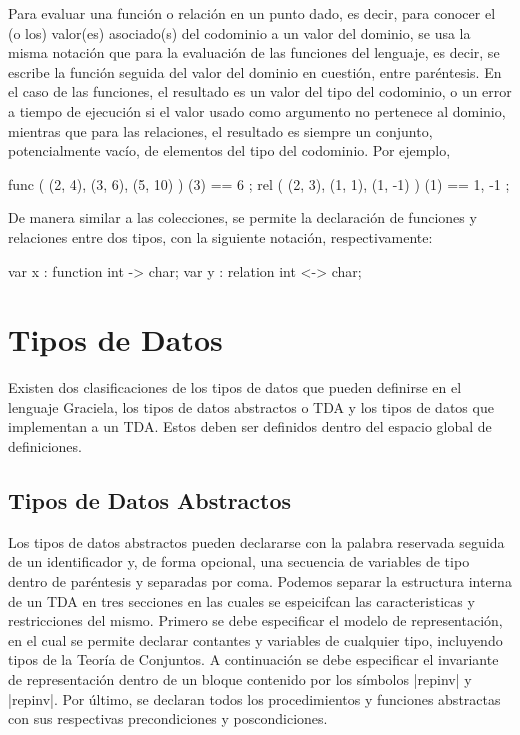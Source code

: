 Para evaluar una función o relación en un punto dado, es decir, para conocer el
(o los) valor(es) asociado(s) del codominio a un valor del dominio, se usa la
misma notación que para la evaluación de las funciones del lenguaje, es decir,
se escribe la función seguida del valor del dominio en cuestión, entre
paréntesis. En el caso de las funciones, el resultado es un valor del tipo del
codominio, o un error a tiempo de ejecución si el valor usado como argumento no
pertenece al dominio, mientras que para las relaciones, el resultado es siempre
un conjunto, potencialmente vacío, de elementos del tipo del codominio. Por
ejemplo,

\begin{gracielacode}
{ func ({ (2, 4), (3, 6), (5, 10) }) (3) == 6 };
{ rel  ({ (2, 3), (1, 1), (1, -1) }) (1) == {1, -1} };
\end{gracielacode}

De manera similar a las colecciones, se permite la declaración de funciones y
relaciones entre dos tipos, con la siguiente notación, respectivamente:

\begin{gracielacode}
var x : function int -> char;
var y : relation int <-> char;
\end{gracielacode}

\section{Tipos de Datos}
Existen dos clasificaciones de los tipos de datos que pueden definirse en el
lenguaje Graciela, los tipos de datos abstractos o TDA y los tipos de datos
que implementan a un TDA. Estos deben ser definidos dentro del espacio global
de definiciones.

\subsection{Tipos de Datos Abstractos}

Los tipos de datos abstractos pueden declararse con la palabra reservada
 seguida de un identificador y, de forma opcional, una secuencia
de variables de tipo dentro de paréntesis y separadas por coma. Podemos separar
la estructura interna de un TDA en tres secciones en las cuales se espeicifcan
las caracteristicas y restricciones del mismo. Primero se debe especificar el
modelo de representación, en el cual se permite declarar contantes y variables
de cualquier tipo, incluyendo tipos de la Teoría de Conjuntos. A continuación se
debe especificar el invariante de representación dentro de un bloque contenido
por los símbolos \ingra|{repinv| y \ingra|repinv}|. Por último, se declaran
todos los procedimientos y funciones abstractas con sus respectivas
precondiciones y poscondiciones.

